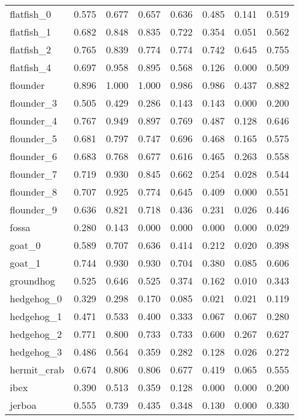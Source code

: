 \begin{table*}[]
\begin{tabular}{l|c|cccccc}
flatfish\_0 & 0.575 & 0.677 & 0.657 & 0.636 & 0.485 & 0.141 & 0.519 \\
flatfish\_1 & 0.682 & 0.848 & 0.835 & 0.722 & 0.354 & 0.051 & 0.562 \\
flatfish\_2 & 0.765 & 0.839 & 0.774 & 0.774 & 0.742 & 0.645 & 0.755 \\
flatfish\_4 & 0.697 & 0.958 & 0.895 & 0.568 & 0.126 & 0.000 & 0.509 \\
flounder & 0.896 & 1.000 & 1.000 & 0.986 & 0.986 & 0.437 & 0.882 \\
flounder\_3 & 0.505 & 0.429 & 0.286 & 0.143 & 0.143 & 0.000 & 0.200 \\
flounder\_4 & 0.767 & 0.949 & 0.897 & 0.769 & 0.487 & 0.128 & 0.646 \\
flounder\_5 & 0.681 & 0.797 & 0.747 & 0.696 & 0.468 & 0.165 & 0.575 \\
flounder\_6 & 0.683 & 0.768 & 0.677 & 0.616 & 0.465 & 0.263 & 0.558 \\
flounder\_7 & 0.719 & 0.930 & 0.845 & 0.662 & 0.254 & 0.028 & 0.544 \\
flounder\_8 & 0.707 & 0.925 & 0.774 & 0.645 & 0.409 & 0.000 & 0.551 \\
flounder\_9 & 0.636 & 0.821 & 0.718 & 0.436 & 0.231 & 0.026 & 0.446 \\
fossa & 0.280 & 0.143 & 0.000 & 0.000 & 0.000 & 0.000 & 0.029 \\
goat\_0 & 0.589 & 0.707 & 0.636 & 0.414 & 0.212 & 0.020 & 0.398 \\
goat\_1 & 0.744 & 0.930 & 0.930 & 0.704 & 0.380 & 0.085 & 0.606 \\
groundhog & 0.525 & 0.646 & 0.525 & 0.374 & 0.162 & 0.010 & 0.343 \\
hedgehog\_0 & 0.329 & 0.298 & 0.170 & 0.085 & 0.021 & 0.021 & 0.119 \\
hedgehog\_1 & 0.471 & 0.533 & 0.400 & 0.333 & 0.067 & 0.067 & 0.280 \\
hedgehog\_2 & 0.771 & 0.800 & 0.733 & 0.733 & 0.600 & 0.267 & 0.627 \\
hedgehog\_3 & 0.486 & 0.564 & 0.359 & 0.282 & 0.128 & 0.026 & 0.272 \\
hermit\_crab & 0.674 & 0.806 & 0.806 & 0.677 & 0.419 & 0.065 & 0.555 \\
ibex & 0.390 & 0.513 & 0.359 & 0.128 & 0.000 & 0.000 & 0.200 \\
jerboa & 0.555 & 0.739 & 0.435 & 0.348 & 0.130 & 0.000 & 0.330
\end{tabular}
\label{tab:moca2}
\end{table*}

